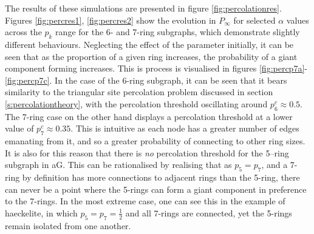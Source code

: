 The results of these simulations are presented in figure \ref{fig:percolationres}.
Figures \ref{fig:percres1}, \ref{fig:percres2} show the evolution in $P_\infty$ for selected $\alpha$ values across the $p_k$ range for the 6\-- and 7\--ring subgraphs, which demonstrate slightly different behaviours.
Neglecting the effect of the \aw{} parameter initially, it can be seen that as the proportion of a given ring increases, the probability of a giant component forming increases.
This is process is visualised in figures \ref{fig:percp7a}\--\ref{fig:percp7c}.
In the case of the 6\--ring subgraph, it can be seen that it bears similarity to the triangular site percolation problem discussed in section \ref{s:percolationtheory}, with the percolation threshold oscillating around $p_6^c\approx0.5$.
The 7\--ring case on the other hand displays a percolation threshold at a lower value of $p_7^c\approx0.35$.
This is intuitive as each node has a greater number of edges emanating from it, and so a greater probability of connecting to other ring sizes.
It is also for this reason that there is \textit{no} percolation threshold for the 5--ring subgraph in aG.
This can be rationalised by realising that as $p_5=p_7$, and a 7\--ring by definition has more connections to adjacent rings than the 5\--ring, there can never be a point where the 5\--rings can form a giant component in preference to the 7\--rings.
In the most extreme case, one can see this in the example of haeckelite, in which $p_5=p_7=\frac{1}{2}$ and all 7\--rings are connected, yet the 5\--rings remain isolated from one another.

